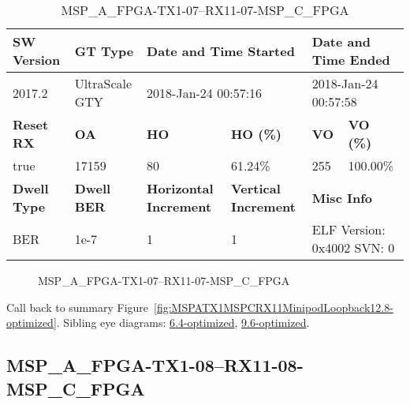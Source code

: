 \begin{table}[h]
\centering
\caption{MSP\_A\_FPGA-TX1-07--RX11-07-MSP\_C\_FPGA}
\label{tab:MSPAFPGATX107RX1107MSPCFPGA12.8-optimized}
\begin{tabular}{@{}|l|l|l|l|l|l|@{}}
\toprule
\textbf{SW Version}                & \textbf{GT Type}   & \multicolumn{2}{l|}{\textbf{Date and Time Started}}            & \multicolumn{2}{l|}{\textbf{Date and Time Ended}}        \\ \midrule
2017.2                       & UltraScale GTY          & \multicolumn{2}{l|}{2018-Jan-24 00:57:16}                   & \multicolumn{2}{l|}{2018-Jan-24 00:57:58}               \\ \midrule
\textbf{Reset RX}                  & \textbf{OA} & \textbf{HO}   & \textbf{HO (\%)} & \textbf{VO} & \textbf{VO (\%)} \\ \midrule
true & 17159        & 80          & 61.24\%        & 255        & 100.00\%       \\ \midrule
\textbf{Dwell Type}                & \textbf{Dwell BER} & \textbf{Horizontal Increment} & \textbf{Vertical Increment}    & \multicolumn{2}{l|}{\textbf{Misc Info}}                  \\ \midrule
BER                            & 1e-7        & 1        & 1           & \multicolumn{2}{l|}{ELF Version: 0x4002 SVN: 0}                         \\ \bottomrule
\end{tabular}
\end{table}

\begin{figure}[h]
\caption{MSP\_A\_FPGA-TX1-07--RX11-07-MSP\_C\_FPGA} \label{fig:MSPAFPGATX107RX1107MSPCFPGA12.8-optimized}
\end{figure}

Call back to summary Figure~\ref{fig:MSPATX1MSPCRX11MinipodLoopback12.8-optimized}.
Sibling eye diagrams: \hyperref[sec:MSPAFPGATX107RX1107MSPCFPGA6.4-optimized]{6.4-optimized}, \hyperref[sec:MSPAFPGATX107RX1107MSPCFPGA9.6-optimized]{9.6-optimized}.

\clearpage
\newpage


\subsection{MSP\_A\_FPGA-TX1-08--RX11-08-MSP\_C\_FPGA}\label{sec:MSPAFPGATX108RX1108MSPCFPGA12.8-optimized}

